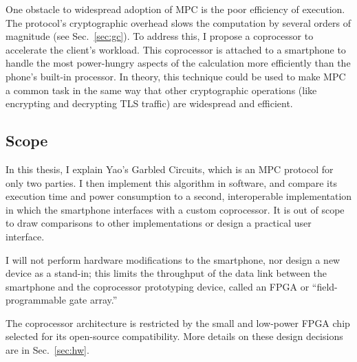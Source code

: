 One obstacle to widespread adoption of MPC is the poor efficiency of execution. The protocol's cryptographic overhead slows the computation by several orders of magnitude (see Sec.~\ref{sec:gc}). To address this, I propose a coprocessor to accelerate the client's workload. This coprocessor is attached to a smartphone to handle the most power-hungry aspects of the calculation more efficiently than the phone's built-in processor. In theory, this technique could be used to make MPC a common task in the same way that other cryptographic operations (like encrypting and decrypting TLS traffic) are widespread and efficient.

\subsection{Scope}
In this thesis, I explain Yao's Garbled Circuits, which is an MPC protocol for only two parties. I then implement this algorithm in software, and compare its execution time and power consumption to a second, interoperable implementation in which the smartphone interfaces with a custom coprocessor. It is out of scope to draw comparisons to other implementations or design a practical user interface.

I will not perform hardware modifications to the smartphone, nor design a new device as a stand-in; this limits the throughput of the data link between the smartphone and the coprocessor prototyping device, called an FPGA or ``field-programmable gate array.''

The coprocessor architecture is restricted by the small and low-power FPGA chip selected for its open-source\cite{IceStorm} compatibility. More details on these design decisions are in Sec.~\ref{sec:hw}.
